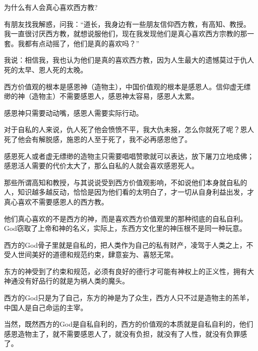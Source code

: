 \documentclass[UTF8, 11pt, oneside]{ctexart}
\newcommand{\jg}{\vspace{2em}} %
\begin{document}
\begin{center}
    \LARGE{为什么有人会真心喜欢西方教?\footnotemark}
\end{center}

有朋友找我解惑，问我：“道长，我身边有一些朋友信仰西方教，有高知、教授。我一直很讨厌西方教，就想说服他们，现在我发现他们是真心喜欢西方宗教的那一套。我都有点动摇了，他们是真的喜欢吗？”

\jg

我说：相信我，我也认为他们是真的喜欢西方教，因为人生最大的遗憾莫过于仇人死的太早、恩人死的太晚。

西方价值观的根本是感恩神（造物主），中国价值观的根本是感恩人。信仰虚无缥缈的神（造物主）不需要感恩人，感恩神太容易，感恩人太累。

感恩神只需要动动嘴，感恩人需要实际行动。

\jg

对于自私的人来说，仇人死了他会愤愤不平，我大仇未报，怎么你就死了呢？恩人死了他会有解脱感，施恩的人至于死了，我不必再感恩他了。

感恩死人或者虚无缥缈的造物主只需要唱唱赞歌就可以表达，放下屠刀立地成佛；感恩活人需要的代价太大了，那么自私的人就会喜欢感恩死人。

\jg


那些所谓高知和教授，与其说说受到西方价值观影响，不如说他们本身就自私的人，知识越多越反动，恰恰是因为他们看的太明白了，才一切从自身利益出发，才真心喜欢不需要感恩人的西方教。

他们真心喜欢的不是西方的神，而是喜欢西方价值观里的那种彻底的自私自利。God窃取了上帝和神的名义，实际上，东西方文化里的神压根不是同一种玩意。

\jg

西方的God骨子里就是自私的，把人类作为自己的私有财产，凌驾于人类之上，不受人世间美好的道德和规范约束，肆意妄为、喜怒无常。

东方的神受到了约束和规范，必须有良好的德行才可能有神权上的正义性，拥有大神通没有好品行的就是为祸人类的魔头。

\jg

西方的God只是为了自己，东方的神是为了众生，西方人只不过是造物主的羔羊，中国人是自己命运的主宰。

当然，既然西方的God是自私自利的，西方的价值观的本质就是自私自利的，他们感恩造物主了，就不需要感恩人了，就没有负担，就没有了人性，就没有负罪感了。
\end{document}
